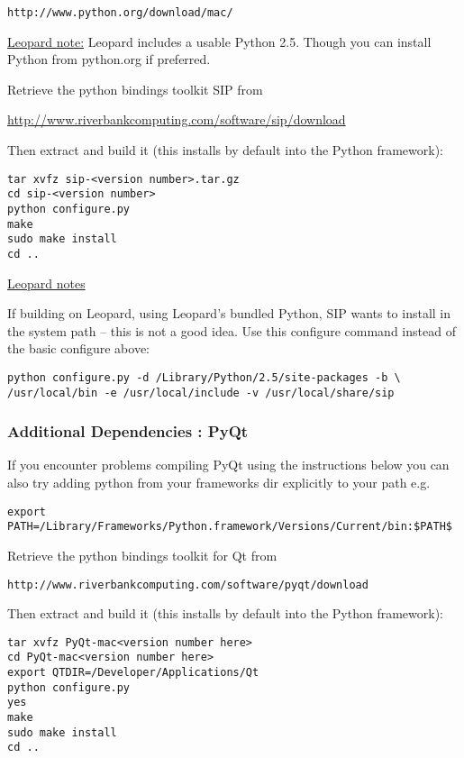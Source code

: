 \begin{verbatim}
http://www.python.org/download/mac/
\end{verbatim}

\underline{Leopard note:} Leopard includes a usable Python 2.5.  Though you can install Python from python.org if preferred.

Retrieve the python bindings toolkit SIP from

\url{http://www.riverbankcomputing.com/software/sip/download}

Then extract and build it (this installs by default into the Python framework):

\begin{verbatim}
tar xvfz sip-<version number>.tar.gz 
cd sip-<version number>
python configure.py 
make 
sudo make install 
cd ..  
\end{verbatim}

\underline{Leopard notes}

If building on Leopard, using Leopard's bundled Python, SIP wants to install in the system path -- this is not a good idea.  Use this configure command instead of the basic configure above:

\begin{verbatim}
python configure.py -d /Library/Python/2.5/site-packages -b \
/usr/local/bin -e /usr/local/include -v /usr/local/share/sip
\end{verbatim}

\subsubsection{Additional Dependencies : PyQt}
If you encounter problems compiling PyQt using the instructions 
below you can also try adding python from your frameworks dir
explicitly to your path e.g.

\begin{verbatim}
export PATH=/Library/Frameworks/Python.framework/Versions/Current/bin:$PATH$
\end{verbatim}

Retrieve the python bindings toolkit for Qt from

\begin{verbatim}
http://www.riverbankcomputing.com/software/pyqt/download
\end{verbatim}

Then extract and build it (this installs by default into the Python framework):

\begin{verbatim}
tar xvfz PyQt-mac<version number here>
cd PyQt-mac<version number here>
export QTDIR=/Developer/Applications/Qt
python configure.py 
yes 
make 
sudo make install 
cd ..  
\end{verbatim}

